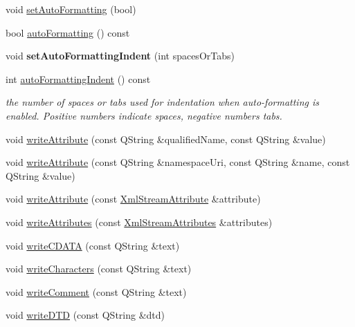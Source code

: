 \begin{DoxyCompactItemize}
\item 
void \hyperlink{class_xml_stream_writer_a537defbbbbbad819448033b22aaf0d28}{set\+Auto\+Formatting} (bool)
\item 
bool \hyperlink{class_xml_stream_writer_a257ecf97cf02f3ca8cb86c2ecf425a8c}{auto\+Formatting} () const
\item 
\mbox{\label{class_xml_stream_writer_a04f90908c7ae4ad5b083d7037a533200}} 
void {\bfseries set\+Auto\+Formatting\+Indent} (int spaces\+Or\+Tabs)
\item 
int \hyperlink{class_xml_stream_writer_a322ab2c9f7ec4d33ef0fb55cfbdd9d7d}{auto\+Formatting\+Indent} () const
\begin{DoxyCompactList}\small\item\em the number of spaces or tabs used for indentation when auto-\/formatting is enabled. Positive numbers indicate spaces, negative numbers tabs. \end{DoxyCompactList}\item 
void \hyperlink{class_xml_stream_writer_a685d12dc71870e20e835085b6326787b}{write\+Attribute} (const Q\+String \&qualified\+Name, const Q\+String \&value)
\item 
void \hyperlink{class_xml_stream_writer_abfbab3a6a1ad652db31e46d40e727f84}{write\+Attribute} (const Q\+String \&namespace\+Uri, const Q\+String \&name, const Q\+String \&value)
\item 
void \hyperlink{class_xml_stream_writer_aaa0061750c74a393ab443af6ddd06db5}{write\+Attribute} (const \hyperlink{class_xml_stream_attribute}{Xml\+Stream\+Attribute} \&attribute)
\item 
void \hyperlink{class_xml_stream_writer_a401845495b28fcc27a7f491ac402ea47}{write\+Attributes} (const \hyperlink{class_xml_stream_attributes}{Xml\+Stream\+Attributes} \&attributes)
\item 
void \hyperlink{class_xml_stream_writer_a812b894549f810c701ca3826acd9cc65}{write\+C\+D\+A\+TA} (const Q\+String \&text)
\item 
void \hyperlink{class_xml_stream_writer_aea9dab80ea787794736d3f2a524780e5}{write\+Characters} (const Q\+String \&text)
\item 
void \hyperlink{class_xml_stream_writer_aa250fc649bdef6373d1f25d4bc7db431}{write\+Comment} (const Q\+String \&text)
\item 
void \hyperlink{class_xml_stream_writer_a6e2b9fe72e7a85b044690cf41aee18fe}{write\+D\+TD} (const Q\+String \&dtd)
\item 

\end{DoxyCompactItemize}
